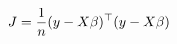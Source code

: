 \documentclass[preview]{standalone}
\begin{document}
\begin{align*}
\special{dvisvgm:raw <g id='unique000'>}J = \frac{1}{n}(y-X\beta)^\top(y-X\beta)\special{dvisvgm:raw </g>}
\end{align*}
\end{document}
